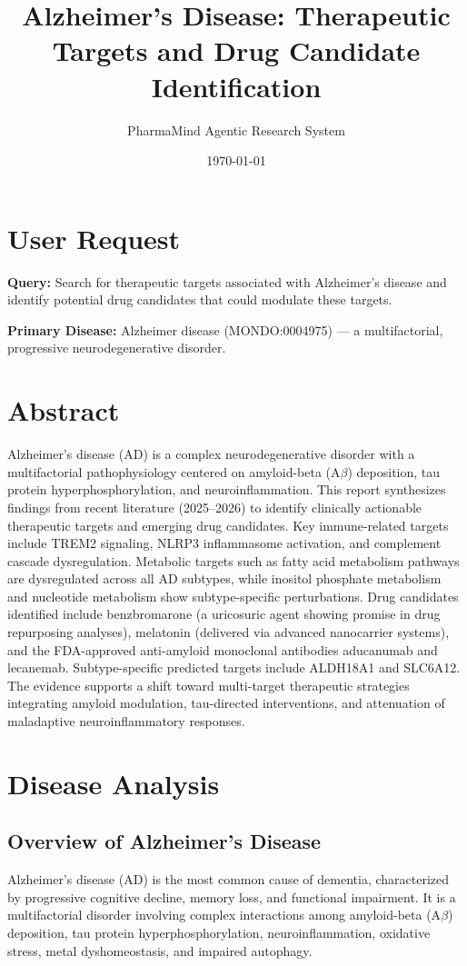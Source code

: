 \documentclass[11pt, a4paper]{article}
\title{Alzheimer's Disease: Therapeutic Targets and Drug Candidate Identification}
\author{PharmaMind Agentic Research System}
\date{\today}
\begin{document}
\maketitle
\tableofcontents
\newpage

\section{User Request}
\textbf{Query:} Search for therapeutic targets associated with Alzheimer's disease and identify potential drug candidates that could modulate these targets.

\textbf{Primary Disease:} Alzheimer disease (MONDO:0004975) — a multifactorial, progressive neurodegenerative disorder.

\section{Abstract}
Alzheimer's disease (AD) is a complex neurodegenerative disorder with a multifactorial pathophysiology centered on amyloid-beta (A$\beta$) deposition, tau protein hyperphosphorylation, and neuroinflammation. This report synthesizes findings from recent literature (2025--2026) to identify clinically actionable therapeutic targets and emerging drug candidates. Key immune-related targets include TREM2 signaling, NLRP3 inflammasome activation, and complement cascade dysregulation. Metabolic targets such as fatty acid metabolism pathways are dysregulated across all AD subtypes, while inositol phosphate metabolism and nucleotide metabolism show subtype-specific perturbations. Drug candidates identified include benzbromarone (a uricosuric agent showing promise in drug repurposing analyses), melatonin (delivered via advanced nanocarrier systems), and the FDA-approved anti-amyloid monoclonal antibodies aducanumab and lecanemab. Subtype-specific predicted targets include ALDH18A1 and SLC6A12. The evidence supports a shift toward multi-target therapeutic strategies integrating amyloid modulation, tau-directed interventions, and attenuation of maladaptive neuroinflammatory responses.

\section{Disease Analysis}

\subsection{Overview of Alzheimer's Disease}
Alzheimer's disease (AD) is the most common cause of dementia, characterized by progressive cognitive decline, memory loss, and functional impairment. It is a multifactorial disorder involving complex interactions among amyloid-beta (A$\beta$) deposition, tau protein hyperphosphorylation, neuroinflammation, oxidative stress, metal dyshomeostasis, and impaired autophagy.
\end{document}

